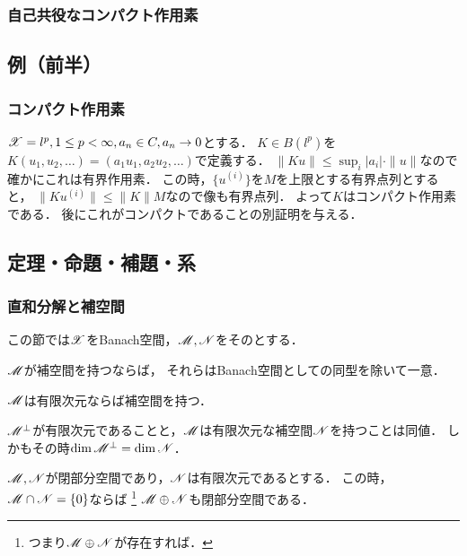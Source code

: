     \subsubsection{自己共役なコンパクト作用素}

    \subsection{例（前半）}
    \subsubsection{コンパクト作用素}
    \begin{Example}[問, p.258]
        $\mathscr{X}=l^p, 1 \leq p<\infty, a_n \in C, a_n \to 0$とする．
        $K \in B(l^p)$を$K(u_1,u_2,\dots)=(a_1u_1,a_2u_2,\dots)$で定義する．
        $\|Ku\| \leq \sup_i|a_i| \cdot \|u\|$なので確かにこれは有界作用素．
        この時，$\{u^{(i)}\}$を$M$を上限とする有界点列とすると，
        $\|K u^{(i)}\| \leq \|K\|M$なので像も有界点列．
        よって$K$はコンパクト作用素である．
        後にこれがコンパクトであることの別証明を与える．
    \end{Example}

    \newpage
    \subsection{定理・命題・補題・系}
    \subsubsection{直和分解と補空間}
    この節では$\mathscr{X}$をBanach空間，$\mathscr{M},\mathscr{N}$をそのとする．
    \begin{Them}[定理11.2, p.252] \label{them1102}
        $\mathscr{M}$が補空間を持つならば，
        それらはBanach空間としての同型を除いて一意．
    \end{Them}
    \begin{Them}[定理11.3, p.253] \label{them1103}
        $\mathscr{M}$は有限次元ならば補空間を持つ．
    \end{Them}
    \begin{Them}[定理11.4, p.253] \label{them1104}
        $\mathscr{M}^{\perp}$が有限次元であることと，$\mathscr{M}$は有限次元な補空間$\mathscr{N}$を持つことは同値．
        しかもその時$\dim \mathscr{M}^{\perp}=\dim \mathscr{N}$．
    \end{Them}
    \begin{Them}[定理11.7, p.255] \label{them1107}
        $\mathscr{M},\mathscr{N}$が閉部分空間であり，$\mathscr{N}$は有限次元であるとする．
        この時，$\mathscr{M} \cap \mathscr{N}=\{0\}$ならば
        \footnote{つまり$\mathscr{M} \oplus \mathscr{N}$が存在すれば．}
        $\mathscr{M} \oplus \mathscr{N}$も閉部分空間である．
    \end{Them}


